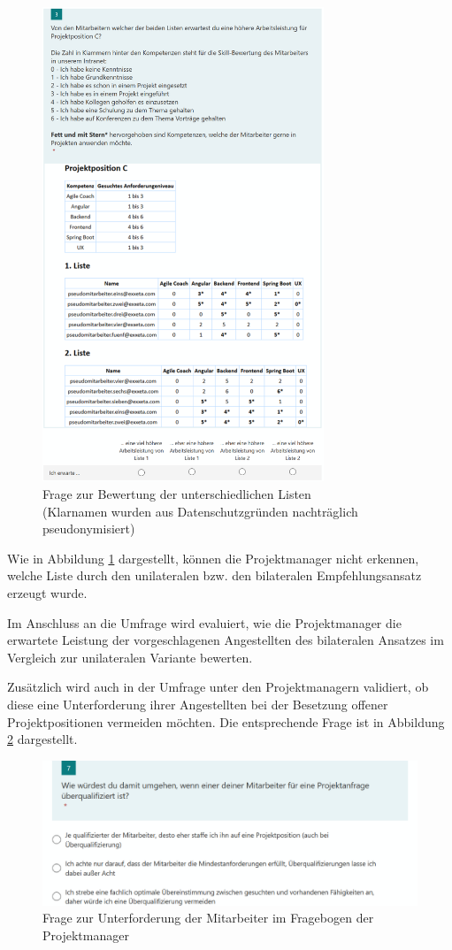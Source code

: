 \begin{figure}[h]
	\centering
	\includegraphics[width=0.75\textwidth]{gfx/projekt-c-liste-pseudonym.png}
	\caption{Frage zur Bewertung der unterschiedlichen Listen\\
	(Klarnamen wurden aus Datenschutzgründen nachträglich pseudonymisiert)}
	\label{fig:methodik:evaluation:manager:abb1}
\end{figure}

Wie in Abbildung \ref{fig:methodik:evaluation:manager:abb1} dargestellt, können die Projektmanager nicht erkennen, welche Liste durch den unilateralen bzw. den bilateralen Empfehlungsansatz erzeugt wurde.

Im Anschluss an die Umfrage wird evaluiert, wie die Projektmanager die erwartete Leistung der vorgeschlagenen Angestellten des bilateralen Ansatzes im Vergleich zur unilateralen Variante bewerten.

Zusätzlich wird auch in der Umfrage unter den Projektmanagern validiert, ob diese eine Unterforderung ihrer Angestellten bei der Besetzung offener Projektpositionen vermeiden möchten. Die entsprechende Frage ist in Abbildung \ref{fig:methodik:evaluation:manager:abb3} dargestellt.

\begin{figure}[h]
	\centering
	\includegraphics[width=1\textwidth]{gfx/umfrage-projektmanager-unterforderung.png}
	\caption{Frage zur Unterforderung der Mitarbeiter im Fragebogen der Projektmanager}
	\label{fig:methodik:evaluation:manager:abb3}
\end{figure}
